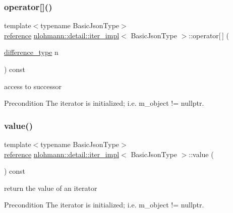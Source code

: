 \subsubsection{\texorpdfstring{operator[]()}{operator[]()}}
{\footnotesize\ttfamily template$<$typename Basic\+Json\+Type$>$ \\
\hyperlink{classnlohmann_1_1detail_1_1iter__impl_a5be8001be099c6b82310f4d387b953ce}{reference} \hyperlink{classnlohmann_1_1detail_1_1iter__impl}{nlohmann\+::detail\+::iter\+\_\+impl}$<$ Basic\+Json\+Type $>$\+::operator\mbox{[}$\,$\mbox{]} (\begin{DoxyParamCaption}\item[{\hyperlink{classnlohmann_1_1detail_1_1iter__impl_a2f7ea9f7022850809c60fc3263775840}{difference\+\_\+type}}]{n }\end{DoxyParamCaption}) const\hspace{0.3cm}{\ttfamily [inline]}}



access to successor 

\begin{DoxyPrecond}{Precondition}
The iterator is initialized; i.\+e. {\ttfamily m\+\_\+object != nullptr}. 
\end{DoxyPrecond}
\mbox{\label{classnlohmann_1_1detail_1_1iter__impl_ab447c50354c6611fa2ae0100ac17845c}} 
\subsubsection{\texorpdfstring{value()}{value()}}
{\footnotesize\ttfamily template$<$typename Basic\+Json\+Type$>$ \\
\hyperlink{classnlohmann_1_1detail_1_1iter__impl_a5be8001be099c6b82310f4d387b953ce}{reference} \hyperlink{classnlohmann_1_1detail_1_1iter__impl}{nlohmann\+::detail\+::iter\+\_\+impl}$<$ Basic\+Json\+Type $>$\+::value (\begin{DoxyParamCaption}{ }\end{DoxyParamCaption}) const\hspace{0.3cm}{\ttfamily [inline]}}



return the value of an iterator 

\begin{DoxyPrecond}{Precondition}
The iterator is initialized; i.\+e. {\ttfamily m\+\_\+object != nullptr}. 
\end{DoxyPrecond}


